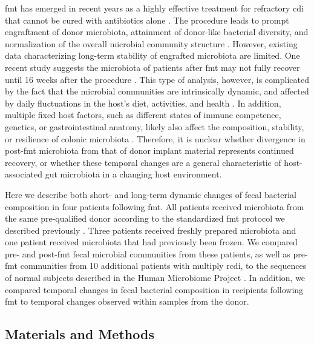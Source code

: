 \Gls{fmt} has emerged in recent years as a highly effective treatment for refractory \gls{cdi} that cannot be cured with antibiotics alone \cite{RN65}. The procedure leads to prompt engraftment of donor microbiota, attainment of donor-like bacterial diversity, and normalization of the overall microbial community structure \cite{RN53moviefmt, RN30, RN66, RN31, RN36, RN4129, RN1}. However, existing data characterizing long-term stability of engrafted microbiota are limited. One recent study suggests the microbiota of patients after \gls{fmt} may not fully recover until 16 weeks after the procedure \cite{RN35moviefmt}. This type of analysis, however, is complicated by the fact that the microbial communities are intrinsically dynamic, and affected by daily fluctuations in the host's diet, activities, and health \cite{RN4235, RN67, RN4195}. In addition, multiple fixed host factors, such as different states of immune competence, genetics, or gastrointestinal anatomy, likely also affect the composition, stability, or resilience of colonic microbiota \cite{RN41, RN74, RN3801, RN73, RN71}. Therefore, it is unclear whether divergence in post-\gls{fmt} microbiota from that of donor implant material represents continued recovery, or whether these temporal changes are a general characteristic of host-associated gut microbiota in a changing host environment.

Here we describe both short- and long-term dynamic changes of fecal bacterial composition in four patients following \gls{fmt}. All patients received microbiota from the same pre-qualified donor according to the standardized \gls{fmt} protocol we described previously \cite{RN45}. Three patients received freshly prepared microbiota and one patient received microbiota that had previously been frozen. We compared pre- and post-\gls{fmt} fecal microbial communities from these patients, as well as pre-\gls{fmt} communities from 10 additional patients with multiply \gls{rcdi}, to the sequences of normal subjects described in the Human Microbiome Project \cite{RN75}.  In addition, we compared temporal changes in fecal bacterial composition in recipients following \gls{fmt} to temporal changes observed within samples from the donor.

\subsection{Materials and Methods}

